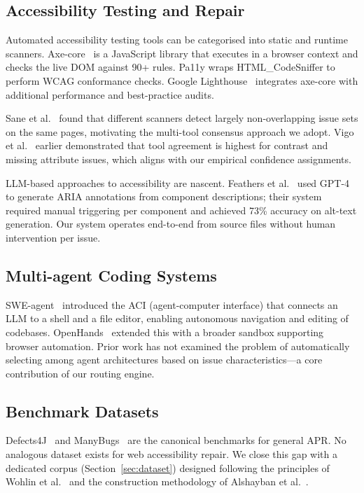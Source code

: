 \documentclass[10pt,conference]{IEEEtran}
\begin{document}
\subsection{Accessibility Testing and Repair}

Automated accessibility testing tools can be categorised into static and
runtime scanners.  Axe-core~\cite{axe} is a JavaScript library that executes
in a browser context and checks the live DOM against 90+ rules.  Pa11y
\cite{pa11y} wraps HTML\_CodeSniffer to perform WCAG conformance checks.
Google Lighthouse~\cite{lighthouse} integrates axe-core with additional
performance and best-practice audits.

Sane et al.\ \cite{sane2023} found that different scanners detect largely
non-overlapping issue sets on the same pages, motivating the multi-tool
consensus approach we adopt.  Vigo et al.\ \cite{vigo2013} earlier
demonstrated that tool agreement is highest for contrast and missing
attribute issues, which aligns with our empirical confidence assignments.

LLM-based approaches to accessibility are nascent.  Feathers et al.\
\cite{feathers2024} used GPT-4 to generate ARIA annotations from component
descriptions; their system required manual triggering per component and
achieved 73\% accuracy on alt-text generation.  Our system operates
end-to-end from source files without human intervention per issue.

\subsection{Multi-agent Coding Systems}

SWE-agent~\cite{sweagent} introduced the ACI (agent-computer interface) that
connects an LLM to a shell and a file editor, enabling autonomous navigation
and editing of codebases.  OpenHands~\cite{openhands2024} extended this with
a broader sandbox supporting browser automation.  Prior work has not examined
the problem of automatically selecting among agent architectures based on
issue characteristics—a core contribution of our routing engine.

\subsection{Benchmark Datasets}

Defects4J~\cite{defects4j} and ManyBugs~\cite{manybugs} are the canonical
benchmarks for general APR.  No analogous dataset exists for web accessibility
repair.  We close this gap with a dedicated corpus (Section~\ref{sec:dataset})
designed following the principles of Wohlin et al.\ \cite{wohlin2012} and
the construction methodology of Alshayban et al.\ \cite{alshayban2020}.
\end{document}
